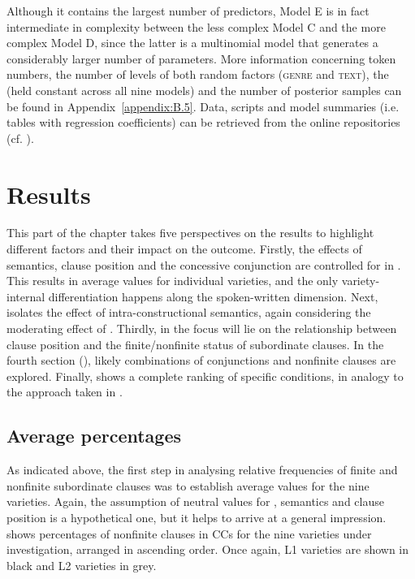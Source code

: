 Although it contains the largest number of predictors, Model E is in fact intermediate in complexity between the less complex Model C and the more complex Model D, since the latter is a multinomial model that generates a considerably larger number of parameters. More information concerning token numbers, the number of levels of both random factors (\textsc{genre} and \textsc{text}), the  (held constant across all nine models) and the number of posterior samples can be found in Appendix~\ref{appendix:B.5}. Data, scripts and model summaries (i.e. tables with regression coefficients) can be retrieved from the online repositories (cf. ).

\section{\label{bkm:Ref75782487}Results}\label{sec:11.2}


This part of the chapter takes five perspectives on the results to highlight different factors and their impact on the outcome. Firstly, the effects of semantics, clause position and the concessive conjunction are controlled for in . This results in average values for individual varieties, and the only variety-internal differentiation happens along the spoken-written dimension. Next,  isolates the effect of intra-constructional semantics, again considering the moderating effect of . Thirdly, in  the focus will lie on the relationship between clause position and the finite/nonfinite status of subordinate clauses. In the fourth section (), likely combinations of conjunctions and nonfinite clauses are explored. Finally,  shows a complete ranking of specific conditions, in analogy to the approach taken in .

\subsection{\label{bkm:Ref75783798}Average percentages}\label{sec:11.2.1}

As indicated above, the first step in analysing relative frequencies of finite and nonfinite subordinate clauses was to establish average values for the nine varieties. Again, the assumption of neutral values for , semantics and clause position is a hypothetical one, but it helps to arrive at a general impression.  shows percentages of nonfinite clauses in CCs for the nine varieties under investigation, arranged in ascending order. Once again, L1 varieties are shown in black and L2 varieties in grey.\largerpage

